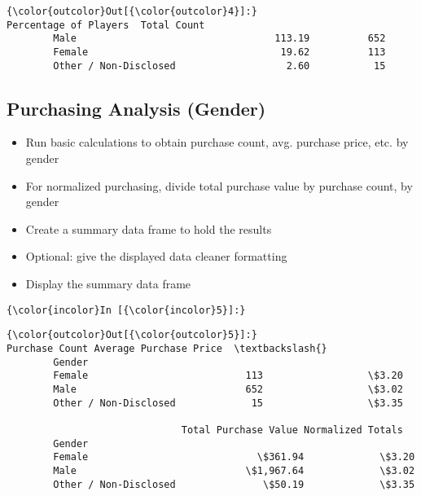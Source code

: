 \documentclass[11pt]{article}
\begin{document}
\begin{Verbatim}[commandchars=\\\{\}]
{\color{outcolor}Out[{\color{outcolor}4}]:}                        Percentage of Players  Total Count
        Male                                  113.19          652
        Female                                 19.62          113
        Other / Non-Disclosed                   2.60           15
\end{Verbatim}
            
    \subsection{Purchasing Analysis
(Gender)}\label{purchasing-analysis-gender}

    \begin{itemize}
\item
  Run basic calculations to obtain purchase count, avg. purchase price,
  etc. by gender
\item
  For normalized purchasing, divide total purchase value by purchase
  count, by gender
\item
  Create a summary data frame to hold the results
\item
  Optional: give the displayed data cleaner formatting
\item
  Display the summary data frame
\end{itemize}

    \begin{Verbatim}[commandchars=\\\{\}]
{\color{incolor}In [{\color{incolor}5}]:} 
\end{Verbatim}


\begin{Verbatim}[commandchars=\\\{\}]
{\color{outcolor}Out[{\color{outcolor}5}]:}                       Purchase Count Average Purchase Price  \textbackslash{}
        Gender                                                        
        Female                           113                  \$3.20   
        Male                             652                  \$3.02   
        Other / Non-Disclosed             15                  \$3.35   
        
                              Total Purchase Value Normalized Totals  
        Gender                                                        
        Female                             \$361.94             \$3.20  
        Male                             \$1,967.64             \$3.02  
        Other / Non-Disclosed               \$50.19             \$3.35  
\end{Verbatim}
            
\end{document}
